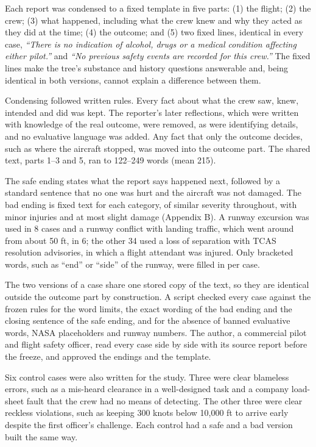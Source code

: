 \documentclass{aer}
\begin{document}
Each report was condensed to a fixed template in five parts: (1) the flight; (2) the crew; (3) what happened, including what the crew knew and why they acted as they did at the time; (4) the outcome; and (5) two fixed lines, identical in every case, \emph{``There is no indication of alcohol, drugs or a medical condition affecting either pilot.''} and \emph{``No previous safety events are recorded for this crew.''} The fixed lines make the tree's substance and history questions answerable and, being identical in both versions, cannot explain a difference between them.

Condensing followed written rules. Every fact about what the crew saw, knew, intended and did was kept. The reporter's later reflections, which were written with knowledge of the real outcome, were removed, as were identifying details, and no evaluative language was added. Any fact that only the outcome decides, such as where the aircraft stopped, was moved into the outcome part. The shared text, parts 1--3 and 5, ran to 122--249 words (mean 215).

The safe ending states what the report says happened next, followed by a standard sentence that no one was hurt and the aircraft was not damaged. The bad ending is fixed text for each category, of similar severity throughout, with minor injuries and at most slight damage (Appendix B). A runway excursion was used in 8 cases and a runway conflict with landing traffic, which went around from about 50 ft, in 6; the other 34 used a loss of separation with TCAS resolution advisories, in which a flight attendant was injured. Only bracketed words, such as ``end'' or ``side'' of the runway, were filled in per case.

The two versions of a case share one stored copy of the text, so they are identical outside the outcome part by construction. A script checked every case against the frozen rules for the word limits, the exact wording of the bad ending and the closing sentence of the safe ending, and for the absence of banned evaluative words, NASA placeholders and runway numbers. The author, a commercial pilot and flight safety officer, read every case side by side with its source report before the freeze, and approved the endings and the template.

Six control cases were also written for the study. Three were clear blameless errors, such as a mis-heard clearance in a well-designed task and a company load-sheet fault that the crew had no means of detecting. The other three were clear reckless violations, such as keeping 300 knots below 10,000 ft to arrive early despite the first officer's challenge. Each control had a safe and a bad version built the same way.
\end{document}
